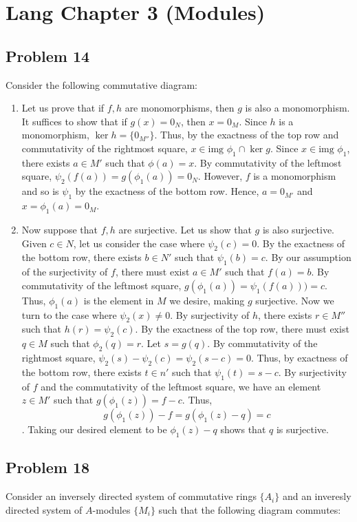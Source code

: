 \documentclass[Lang.tex]{subfiles}
\begin{document}
\section*{Lang Chapter 3 (Modules)}

\subsection*{Problem 14}

Consider the following commutative diagram:


	\begin{enumerate}
		\item Let us prove that if $f,h$ are monomorphisms, then $g$ is also a monomorphism. 
		It suffices to show that if $g(x) = 0_N$, then $x = 0_M$. 
		Since $h$ is a monomorphism, $\ker h = \{0_{M''}\}$. Thus, by the exactness of the top row and commutativity of the rightmost square, $x \in \text{img }\phi_1 \cap \ker{g}$. Since $x \in \text{img }\phi_1$, there exists $a \in M'$ such that $\phi(a) = x$. By commutativity of the leftmost square, $\psi_2(f(a)) = g(\phi_1(a)) = 0_N$. However, $f$ is a monomorphism and so is $\psi_1$ by the exactness of the bottom row. Hence, $a = 0_{M'}$ and $x = \phi_1(a) = 0_M$.
		\item Now suppose that $f,h$ are surjective. Let us show that $g$ is also surjective. 
		Given $c \in N$, let us consider the case where $\psi_2(c) = 0$. By the exactness of the bottom row, there exists $b \in N'$ such that $\psi_1(b) = c$. By our assumption of the surjectivity of $f$, there must exist $a \in M'$ such that $f(a) = b$. 
		By commutativity of the leftmost square, $g(\phi_1(a)) = \psi_1(f(a))) = c$. Thus, $\phi_1(a)$ is the element in $M$ we desire, making $g$ surjective. 
		Now we turn to the case where $\psi_2(x) \neq 0$. By surjectivity of $h$, there exists $r \in M''$ such that $h(r) = \psi_2(c)$. By the exactness of the top row, there must exist $q \in M$ such that $\phi_2(q) = r$. Let $s = g(q)$. By commutativity of the rightmost square, $\psi_2(s) - \psi_2(c) = \psi_2(s - c) = 0$. 
		Thus, by exactness of the bottom row, there exists $t \in n'$ such that $\psi_1(t) = s - c$. By surjectivity of $f$ and the commutativity of the leftmost square, we have an element $z \in M'$ such that $g(\phi_1(z)) = f - c$. Thus, 
		$$ g(\phi_1(z)) - f = g(\phi_1(z) - q) = c$$. Taking our desired element to be $\phi_1(z) - q$ shows that $q$ is surjective.
	\end{enumerate}

	\subsection*{Problem 18}
	
	Consider an inversely directed system of commutative rings $\{A_i\}$ and an inveresly directed system of $A$-modules $\{M_i\}$ such that the following diagram commutes:
	
\end{document}
